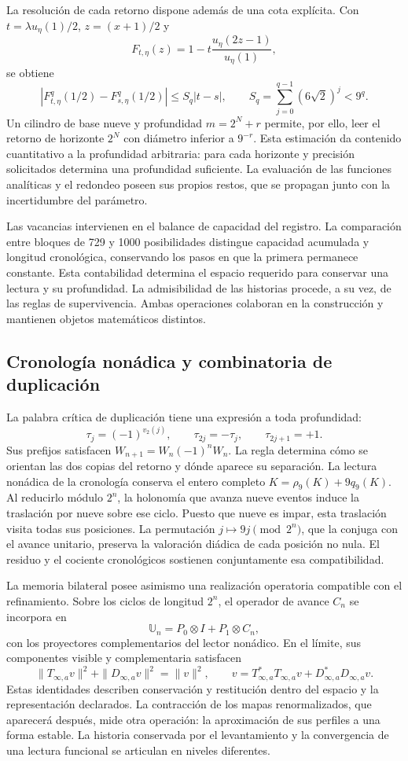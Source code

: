 La resolución de cada retorno dispone además de una cota explícita. Con
\(t=\lambda u_\eta(1)/2\), \(z=(x+1)/2\) y
\[
F_{t,\eta}(z)=1-t\frac{u_\eta(2z-1)}{u_\eta(1)},
\]
se obtiene
\[
\left|F_{t,\eta}^{q}(1/2)-F_{s,\eta}^{q}(1/2)\right|
\le S_q|t-s|,\qquad S_q=\sum_{j=0}^{q-1}(6\sqrt2)^j<9^q.
\]
Un cilindro de base nueve y profundidad \(m=2^N+r\) permite, por ello, leer
el retorno de horizonte \(2^N\) con diámetro inferior a \(9^{-r}\). Esta
estimación da contenido cuantitativo a la profundidad arbitraria: para cada
horizonte y precisión solicitados determina una profundidad suficiente. La
evaluación de las funciones analíticas y el redondeo poseen sus propios
restos, que se propagan junto con la incertidumbre del parámetro.

Las vacancias intervienen en el balance de capacidad del registro. La
comparación entre bloques de 729 y 1000 posibilidades distingue capacidad
acumulada y longitud cronológica, conservando los pasos en que la primera
permanece constante. Esta contabilidad determina el espacio requerido para
conservar una lectura y su profundidad. La admisibilidad de las historias
procede, a su vez, de las reglas de supervivencia. Ambas operaciones
colaboran en la construcción y mantienen objetos matemáticos distintos.

\subsection{Cronología nonádica y combinatoria de duplicación}

La palabra crítica de duplicación tiene una expresión a toda profundidad:
\[
\tau_j=(-1)^{v_2(j)},\qquad
\tau_{2j}=-\tau_j,\qquad \tau_{2j+1}=+1.
\]
Sus prefijos satisfacen \(W_{n+1}=W_n(-1)^nW_n\). La regla determina cómo
se orientan las dos copias del retorno y dónde aparece su separación. La
lectura nonádica de la cronología conserva el entero completo
\(K=\rho_9(K)+9q_9(K)\). Al reducirlo módulo \(2^n\), la holonomía que
avanza nueve eventos induce la traslación por nueve sobre ese ciclo. Puesto
que nueve es impar, esta traslación visita todas sus posiciones. La
permutación \(j\mapsto9j\pmod{2^n}\), que la conjuga con el avance unitario,
preserva la valoración diádica de cada posición no nula. El residuo y el cociente
cronológicos sostienen conjuntamente esa compatibilidad.

La memoria bilateral posee asimismo una realización operatoria compatible
con el refinamiento. Sobre los ciclos de longitud \(2^n\), el operador de
avance \(C_n\) se incorpora en
\[
\mathbb U_n=P_0\otimes I+P_1\otimes C_n,
\]
con los proyectores complementarios del lector nonádico. En el límite, sus
componentes visible y complementaria satisfacen
\[
\|T_{\infty,a}v\|^2+\|D_{\infty,a}v\|^2=\|v\|^2,
\qquad
v=T_{\infty,a}^*T_{\infty,a}v+D_{\infty,a}^*D_{\infty,a}v.
\]
Estas identidades describen conservación y restitución dentro del espacio
y la representación declarados. La contracción de los mapas renormalizados,
que aparecerá después, mide otra operación: la aproximación de sus perfiles
a una forma estable. La historia conservada por el levantamiento y la
convergencia de una lectura funcional se articulan en niveles diferentes.

